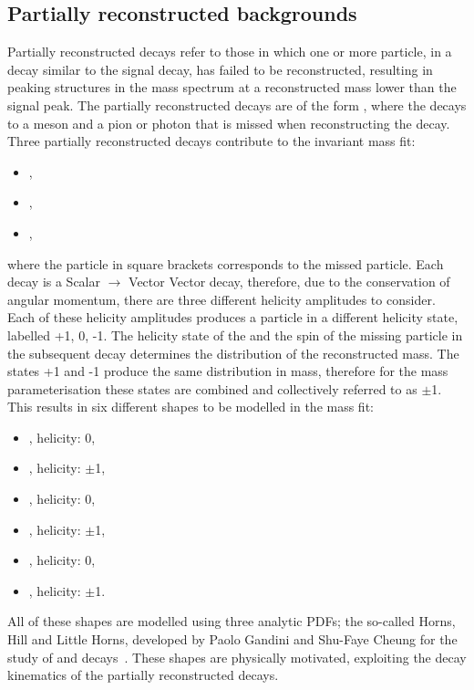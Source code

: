\subsection{Partially reconstructed backgrounds}
\label{sec:massfit:partreco}

Partially reconstructed decays refer to those in which one or more particle, in a \B decay similar to the signal decay, has failed to be reconstructed, resulting in peaking structures in the \B mass spectrum at a reconstructed mass lower than the signal peak. The partially reconstructed decays are of the form \decay{\B}{\Dstar\Kstar}, where the \Dstar decays to a \Dz meson and a pion or photon that is missed when reconstructing the decay. Three partially reconstructed decays contribute to the invariant mass fit:

\begin{itemize}
\item{\decay{\Bm}{(\decay{\Dstarz}{\Dz[\piz]})\Kstarm},}
\item{\decay{\Bm}{(\decay{\Dstarz}{\Dz[\gamma]})\Kstarm},}
\item{\decay{\Bd}{(\decay{\Dstarp}{\Dz[\pip]})\Kstarm},}
\end{itemize}
where the particle in square brackets corresponds to the missed particle. Each \decay{\B}{\Dstar\Kstar} decay is a Scalar $\to$ Vector Vector decay, therefore, due to the conservation of angular momentum, there are three different helicity amplitudes to consider. Each of these helicity amplitudes produces a \Dstar particle in a different helicity state, labelled +1, 0, -1. The helicity state of the \Dstar and the spin of the missing particle in the subsequent \Dstar decay determines the distribution of the reconstructed \B mass. The states +1 and -1 produce the same distribution in \Bm mass, therefore for the mass parameterisation these states are combined and collectively referred to as $\pm$1. This results in six different shapes to be modelled in the mass fit:
\begin{itemize}
\item{\decay{\Bm}{(\decay{\Dstarz}{\Dz[\piz]})\Kstarm}, \Dstarz helicity: 0,} 
\item{\decay{\Bm}{(\decay{\Dstarz}{\Dz[\piz]})\Kstarm}, \Dstarz helicity: $\pm$1,} 
\item{\decay{\Bm}{(\decay{\Dstarz}{\Dz[\gamma]})\Kstarm}, \Dstarz helicity: 0,}
\item{\decay{\Bm}{(\decay{\Dstarz}{\Dz[\gamma]})\Kstarm}, \Dstarz helicity: $\pm$1,}
\item{\decay{\Bd}{(\decay{\Dstarp}{\Dz[\pip]})\Kstarm}, \Dstarp helicity: 0,}
\item{\decay{\Bd}{(\decay{\Dstarp}{\Dz[\pip]})\Kstarm}, \Dstarp helicity: $\pm$1.}
\end{itemize}
All of these shapes are modelled using three analytic PDFs; the so-called Horns, Hill and Little Horns, developed by Paolo Gandini and Shu-Faye Cheung for the study of  and \decay{\Bz}{\D\Kstarz} decays~\cite{LHCb-PAPER-2017-021,LHCb-PAPER-2016-006}. These shapes are physically motivated, exploiting the decay kinematics of the partially reconstructed decays.


